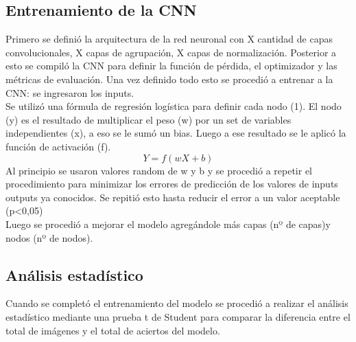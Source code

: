 \subsection{Entrenamiento de la CNN}
Primero se definió la arquitectura de la red neuronal con X cantidad de capas convolucionales, X capas de 
agrupación, X capas de normalización. Posterior a esto se compiló la CNN para definir la función de pérdida, 
el optimizador y las métricas de evaluación. Una vez definido todo esto se procedió a entrenar a la CNN: 
se ingresaron los inputs. \\
Se utilizó una fórmula de regresión logística para definir cada nodo (1). El nodo (y) es el resultado de 
multiplicar el peso (w) por un set de variables independientes (x), a eso se le sumó un bias. Luego a ese 
resultado se le aplicó la función de activación (f).
\begin{equation}
    Y = f (wX+ b)
\end{equation}
Al principio se usaron valores random de w y b y se procedió a repetir el procedimiento para minimizar los 
errores de predicción de los valores de inputs  outputs ya conocidos. Se repitió esto hasta reducir el error 
a un valor aceptable (p<0,05)\\
Luego se procedió a mejorar el modelo agregándole más capas (nº de capas)y nodos (nº de nodos).\\

\subsection{Análisis estadístico}
Cuando se completó el entrenamiento del modelo se procedió a realizar el análisis estadístico mediante una 
prueba t de Student para comparar la diferencia entre el total de imágenes y el total de aciertos del modelo.